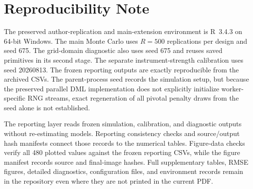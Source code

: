 \section{Reproducibility Note}
\label{app:reproducibility}

The preserved author-replication and main-extension environment is R~3.4.3 on 64-bit Windows. The main Monte Carlo uses $R=500$ replications per design and seed 675. The grid-domain diagnostic also uses seed 675 and reuses saved primitives in its second stage. The separate instrument-strength calibration uses seed 20260813. The frozen reporting outputs are exactly reproducible from the archived CSVs. The parent-process seed records the simulation setup, but because the preserved parallel DML implementation does not explicitly initialize worker-specific RNG streams, exact regeneration of all pivotal penalty draws from the seed alone is not established.

The reporting layer reads frozen simulation, calibration, and diagnostic outputs without re-estimating models. Reporting consistency checks and source/output hash manifests connect those records to the numerical tables. Figure-data checks verify all 480 plotted values against the frozen reporting CSVs, while the figure manifest records source and final-image hashes. Full supplementary tables, RMSE figures, detailed diagnostics, configuration files, and environment records remain in the repository even where they are not printed in the current PDF.
